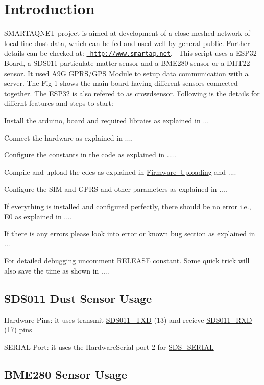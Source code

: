 \hypertarget{index_intro}{}\section{Introduction}\label{index_intro}
S\+M\+A\+R\+T\+A\+Q\+N\+ET project is aimed at development of a close-\/meshed network of local fine-\/dust data, which can be fed and used well by general public. Further details can be checked at\+: \href{http://www.smartaq.net}{\texttt{ http\+://www.\+smartaq.\+net}}.~\newline
 This script uses a E\+S\+P32 Board, a S\+D\+S011 particulate matter sensor and a B\+M\+E280 sensor or a D\+H\+T22 sensor. It used A9G G\+P\+R\+S/\+G\+PS Module to setup data communication with a server. The Fig-\/1 shows the main board having different sensors connected together. The E\+S\+P32 is also refered to as crowdsensor. Following is the details for differnt features and steps to start\+:~\newline

\begin{DoxyItemize}
\item Install the arduino, board and required libraies as explained in ...
\item Connect the hardware as explained in ....
\item Configure the constants in the code as explained in .....
\item Compile and upload the cdes as explained in \mbox{\hyperlink{index_upload}{Firmware Uploading}} and ....
\item Configure the S\+IM and G\+P\+RS and other parameters as explained in ....
\item If everything is installed and configured perfectly, there should be no error i.\+e., E0 as explained in ....
\item If there is any errors please look into error or known bug section as explained in ...
\item For detailed debugging uncomment R\+E\+L\+E\+A\+SE constant. Some quick trick will also save the time as shown in .... 
\end{DoxyItemize}\hypertarget{index_sdso11}{}\subsection{S\+D\+S011 Dust Sensor Usage}\label{index_sdso11}

\begin{DoxyItemize}
\item Hardware Pins\+: it uses transmit \mbox{\hyperlink{sensor_8h_a7130f8006502cdaa31094baa3f4dd3fa}{S\+D\+S011\+\_\+\+T\+XD}} (13) and recieve \mbox{\hyperlink{sensor_8h_ad2b404eb4de525cef31b8413f5d14b13}{S\+D\+S011\+\_\+\+R\+XD}} (17) pins
\item S\+E\+R\+I\+AL Port\+: it uses the Hardware\+Serial port 2 for \mbox{\hyperlink{sensor_8h_a8f7824c0f2a3aa7e9bac94eac190fa7e}{S\+D\+S\+\_\+\+S\+E\+R\+I\+AL}} 
\end{DoxyItemize}\hypertarget{index_bme280}{}\subsection{B\+M\+E280 Sensor Usage}\label{index_bme280}

